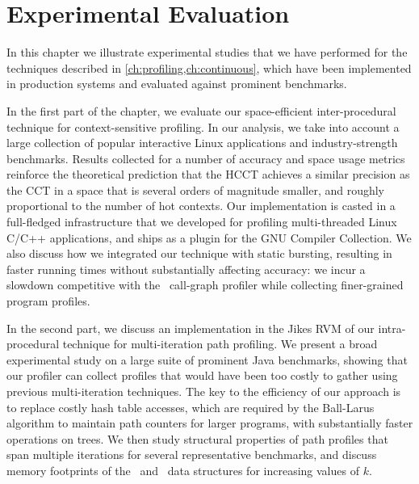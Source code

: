 \chapter{Experimental Evaluation}
\label{ch:experiments}

In this chapter we illustrate experimental studies that we have performed for the techniques described in \mychapter\ref{ch:profiling,ch:continuous}, which have been implemented in production systems and evaluated against prominent benchmarks.  


In the first part of the chapter, we evaluate our space-efficient inter-procedural technique for context-sensitive profiling. In our analysis, we take into account a large collection of popular interactive Linux applications and industry-strength benchmarks. Results collected for a number of accuracy and space usage metrics reinforce the theoretical prediction that the HCCT achieves a similar precision as the CCT in a space that is several orders of magnitude smaller, and roughly proportional to the number of hot contexts. Our implementation is casted in a full-fledged infrastructure that we developed for profiling multi-threaded Linux C/C++ applications, and ships as a plugin for the GNU Compiler Collection. We also discuss how we integrated our technique with static bursting, resulting in faster running times without substantially affecting accuracy: we incur a slowdown competitive with the \gprof\ call-graph profiler while collecting finer-grained program profiles. 

In the second part, we discuss an implementation in the Jikes RVM of our intra-procedural technique for multi-iteration path profiling. We present a broad experimental study on a large suite of prominent Java benchmarks, showing that our profiler can collect profiles that would have been too costly to gather using previous multi-iteration techniques. The key to the efficiency of our approach is to replace costly hash table accesses, which are  required by the Ball-Larus algorithm to maintain path counters for larger programs, with substantially faster operations on trees. We then study structural properties of path profiles that span multiple iterations for several representative benchmarks, and discuss memory footprints of the \ksf\ and \kipf\ data structures for increasing values of $k$.

